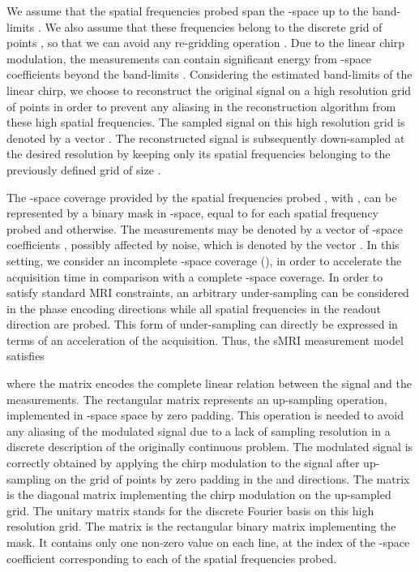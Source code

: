 \documentclass[10pt,draftcls, onecolumn]{IEEEtran}
\begin{document}
We assume that the spatial frequencies probed span the -space up to the band-limits . We also assume that these frequencies belong to the discrete grid of points , so that we can avoid any re-gridding operation \cite{haake99}. Due to the linear chirp modulation, the measurements can contain significant energy from -space coefficients beyond the band-limits . Considering the estimated band-limits of the linear chirp, we choose to reconstruct the original signal  on a high resolution grid of  points in order to prevent any aliasing in the reconstruction algorithm from these high spatial frequencies. The sampled signal on this high resolution grid is denoted by a vector . The reconstructed signal is subsequently down-sampled at the desired resolution by keeping only its spatial frequencies belonging to the previously defined grid of size .

The -space coverage provided by the  spatial frequencies probed , with , can be represented by a binary mask in -space, equal to  for each spatial frequency probed and  otherwise. The measurements may be denoted by a vector of  -space coefficients , possibly affected by noise, which is denoted by the vector . In this setting, we consider an incomplete -space coverage (), in order to accelerate the acquisition time in comparison with a complete -space coverage. In order to satisfy standard MRI constraints, an arbitrary under-sampling can be considered in the phase encoding directions while all spatial frequencies in the readout direction  are probed. This form of under-sampling can directly be expressed in terms of an acceleration of the acquisition. Thus, the sMRI measurement model satisfies

where the matrix  encodes the complete linear relation between the signal and the measurements. The rectangular matrix  represents an up-sampling operation, implemented in -space space by zero padding. This operation is needed to avoid any aliasing of the modulated signal due to a lack of sampling resolution in a discrete description of the originally continuous problem. The modulated signal is correctly obtained by applying the chirp modulation to the signal after up-sampling on the grid of  points by zero padding in the  and  directions. The matrix  is the diagonal matrix implementing the chirp modulation on the up-sampled grid. The unitary matrix  stands for the discrete Fourier basis on this high resolution grid. The matrix  is the rectangular binary matrix implementing the mask. It contains only one non-zero value on each line, at the index of the -space coefficient corresponding to each of the spatial frequencies probed.
\end{document}
